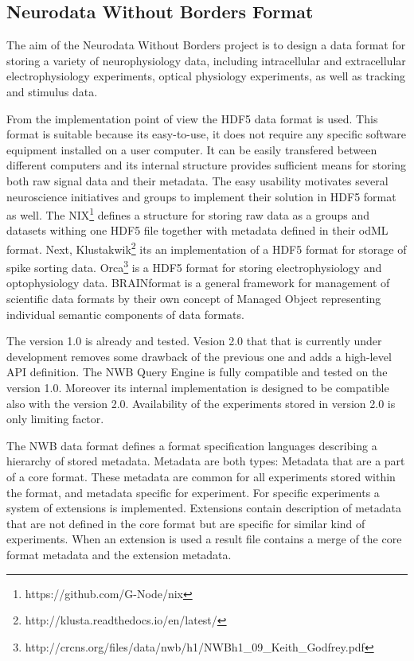\documentclass[utf8]{frontiersSCNS} %
\begin{document}
\subsection{Neurodata Without Borders Format}
\label{nwb}

The aim of the Neurodata Without Borders project is to design a data format for storing a variety of neurophysiology data, including intracellular and extracellular electrophysiology experiments, optical physiology experiments, as well as tracking and stimulus data.

From the implementation point of view the HDF5 data format is used. This format is suitable because its easy-to-use, it does not require any specific software equipment installed on a user computer. It can be easily transfered between different computers and its internal structure provides sufficient means for storing both raw signal data and their metadata. The easy usability motivates several neuroscience initiatives and groups to implement their solution in HDF5 format as well. The NIX\footnote{https://github.com/G-Node/nix} defines a structure for storing raw data as a groups and datasets withing one HDF5 file together with metadata defined in their odML \citep{10.3389/fninf.2011.00016} format. Next,  Klustakwik\footnote{http://klusta.readthedocs.io/en/latest/} its an implementation of a HDF5 format for storage of spike sorting data. Orca\footnote{http://crcns.org/files/data/nwb/h1/NWBh1\_09\_Keith\_Godfrey.pdf} is a HDF5 format for storing electrophysiology and optophysiology data. BRAINformat \citep{10.3389/fninf.2016.00048} is a general framework for management of scientific data formats by their own concept of Managed Object representing individual semantic components of data formats.  

The version 1.0 is already and tested. Vesion 2.0 that that is currently under development removes some drawback of the previous one and adds a high-level API definition. The NWB Query Engine is fully compatible and tested on the version 1.0. Moreover its internal implementation is designed to be compatible also with the version 2.0. Availability of the experiments stored in version 2.0 is only limiting factor.

The NWB data format defines a format specification languages describing a hierarchy of stored metadata. Metadata are both types: Metadata that are a part of a core format. These  metadata are common for all experiments stored within the format, and metadata specific for experiment. For specific experiments a system of extensions is implemented. Extensions contain description of metadata that are not defined in the core format but are specific for similar kind of experiments. When an extension is used a result file contains a merge of the core format metadata and the extension metadata.
\end{document}
